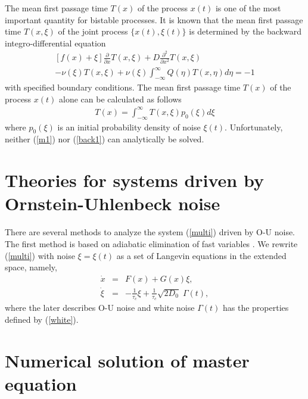 \documentclass[authoryear,draft,1p,times]{elsarticle}
\renewcommand{\=}{\stackrel{\mathrm{d}}{=}}
\begin{document}
The mean first passage time $T(x)$ of the process
$x(t)$ is one of the most important quantity for bistable processes.
It is known  that the mean first passage
time $T(x, \xi)$ of the joint process
$\{x(t), \xi(t)\}$ is determined by the backward integro-differential
equation
%
\begin{eqnarray}  \label{back1}
[f(x)+\xi] {\frac \partial {\partial x}} T(x, \xi)
+D{\frac{\partial ^2}{\partial x^2}} T(x, \xi)\nonumber\\
- \nu (\xi) T(x, \xi) + \nu(\xi) \int_{-\infty}^{\infty} Q (\eta)
T(x, \eta) d\eta = -1
\end{eqnarray}
%
with specified boundary conditions.
The mean first passage time $T(x)$ of the process
$x(t)$ alone can be calculated as follows \cite{luc}
%
\begin{eqnarray}  \label{mfpt}
T(x) = \int_{-\infty}^{\infty} T(x, \xi) p_0(\xi) d\xi
\end{eqnarray}
%
where $p_0(\xi)$ is an initial probability density of noise $\xi(t)$.
Unfortunately, neither (\ref{m1}) nor (\ref{back1}) can  analytically be
solved.


\section{Theories for systems driven by Ornstein-Uhlenbeck noise} 


There are several methods to analyze the system (\ref{multi}) 
driven by O-U noise. 
The first method is based on adiabatic elimination of 
fast variables \cite{jung1}.  We rewrite (\ref{multi}) with 
noise $\xi = \xi(t)$ as a
 set of Langevin equations in the extended space, namely,    
%
\begin{eqnarray}
\label{set1}
 \dot x &=& F(x) + G(x) \xi, \nonumber\\
\dot \xi &=& -\frac{1}{\tau_c} \xi 
+\frac{1}{\tau_c} \sqrt{2D_0} \;\Gamma(t),
\end{eqnarray}
% 
where the later describes O-U noise and  white noise $\Gamma(t)$ has the 
properties defined by (\ref{white}). 

  



\section{Numerical solution of master equation}
\end{document}
